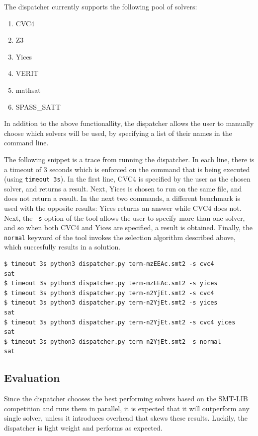 \documentclass{article}
\begin{document}
The dispatcher currently supports the following pool of solvers:
\begin{enumerate}
\item CVC4 \cite{CVC4}
\item Z3 \cite{Z3}
\item Yices \cite{Dutertre:cav2014}
\item VERIT \cite{10.1007/978-3-642-02959-2_12}
\item mathsat \cite{mathsat5}
\item SPASS\_SATT \cite{10.1007/978-3-030-29436-6_7}
\end{enumerate}

In addition to the above functionallity, the dispatcher allows the user to manually choose
which solvers will be used, by specifying a list of their names in the command line.

The following snippet is a trace from running the dispatcher.
In each line, there is a timeout of 3 seconds which is enforced on the command that
is being executed (using \verb!timeout 3s!).
In the first line, CVC4 is specified by the user as the chosen solver, 
and returns a result.
Next, Yices is chosen to run on the same file, and does not return a result.
In the next two commands, a different benchmark is used with the opposite results:
Yices returns an answer while CVC4 does not.
Next, the \verb!-s! option of the tool allows the user to specify more than one solver,
and so when both CVC4 and Yices are specified, a result is obtained.
Finally, the \verb!normal! keyword of the tool invokes the selection algorithm
described above, which succesfully results in a solution.

\begin{center}
\begin{verbatim}
$ timeout 3s python3 dispatcher.py term-mzEEAc.smt2 -s cvc4
sat
$ timeout 3s python3 dispatcher.py term-mzEEAc.smt2 -s yices
$ timeout 3s python3 dispatcher.py term-n2YjEt.smt2 -s cvc4
$ timeout 3s python3 dispatcher.py term-n2YjEt.smt2 -s yices
sat
$ timeout 3s python3 dispatcher.py term-n2YjEt.smt2 -s cvc4 yices
sat
$ timeout 3s python3 dispatcher.py term-n2YjEt.smt2 -s normal
sat
\end{verbatim}
\end{center}

\subsection{Evaluation}

Since the dispatcher chooses the best performing solvers based on
the SMT-LIB competition
and runs them in parallel,
it is expected that it will outperform any single solver,
unless it introduces overhead that skews these results.
Luckily, the dispatcher is light weight and performs
as expected.
\end{document}
